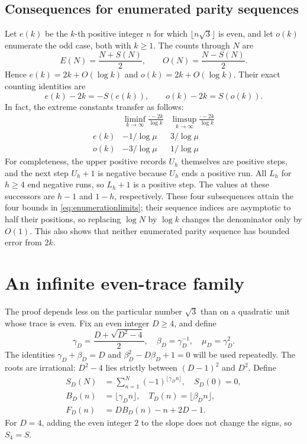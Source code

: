\documentclass[11pt]{article}
\theoremstyle{definition}
\numberwithin{equation}{section}
\begin{document}
\subsection{Consequences for enumerated parity sequences}
Let $e(k)$ be the $k$-th positive integer $n$ for which $\lfloor n\sqrt3\rfloor$ is even, and let $o(k)$ enumerate the odd case, both with $k\ge1$. The counts through $N$ are
\[
 E(N)=\frac{N+S(N)}2,\qquad O(N)=\frac{N-S(N)}2.
\]
Hence $e(k)=2k+O(\log k)$ and $o(k)=2k+O(\log k)$. Their exact counting identities are
\[
 e(k)-2k=-S(e(k)),\qquad o(k)-2k=S(o(k)).
\]
In fact, the extreme constants transfer as follows:
\begin{equation}\label{eq:enumerationlimits}
\begin{array}{c|cc}
&\displaystyle\liminf_{k\to\infty}\frac{\cdot-2k}{\log k}
&\displaystyle\limsup_{k\to\infty}\frac{\cdot-2k}{\log k}\\[5pt]\hline
 e(k)&-1/\log\mu&3/\log\mu\\[3pt]
 o(k)&-3/\log\mu&1/\log\mu
\end{array}
\end{equation}
For completeness, the upper positive records $U_h$ themselves are positive steps, and the next step $U_h+1$ is negative because $U_h$ ends a positive run. All $L_h$ for $h\ge4$ end negative runs, so $L_h+1$ is a positive step. The values at these successors are $h-1$ and $1-h$, respectively. These four subsequences attain the four bounds in \eqref{eq:enumerationlimits}; their sequence indices are asymptotic to half their positions, so replacing $\log N$ by $\log k$ changes the denominator only by $O(1)$. This also shows that neither enumerated parity sequence has bounded error from $2k$.

\section{An infinite even-trace family}\label{sec:general}
The proof depends less on the particular number $\sqrt3$ than on a quadratic unit whose trace is even.
Fix an even integer $D\ge4$, and define
\begin{equation}\label{eq:generalconstants}
 \gamma_D=\frac{D+\sqrt{D^2-4}}2,\quad
 \beta_D=\gamma_D^{-1},\quad
 \mu_D=\gamma_D^2.
\end{equation}
The identities $\gamma_D+\beta_D=D$ and $\beta_D^2-D\beta_D+1=0$ will be used repeatedly. The roots are irrational: $D^2-4$ lies strictly between $(D-1)^2$ and $D^2$. Define
\begin{align}
 S_D(N)&=\sum_{n=1}^N(-1)^{\lfloor\gamma_Dn\rfloor},\quad S_D(0)=0,\label{eq:generalwalk}\\
 B_D(n)&=\lfloor\gamma_Dn\rfloor,\quad T_D(n)=\lfloor\beta_Dn\rfloor,\label{eq:generalBT}\\
 F_D(n)&=D B_D(n)-n+2D-1.\label{eq:generalF}
\end{align}
For $D=4$, adding the even integer $2$ to the slope does not change the signs, so $S_4=S$.
\end{document}
